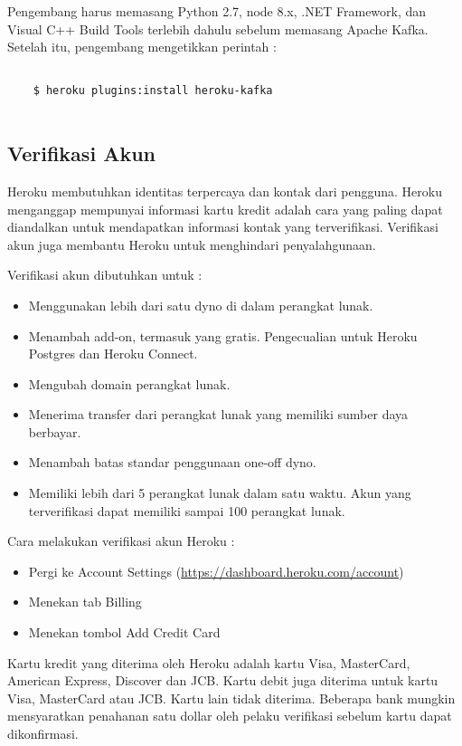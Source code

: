 Pengembang harus memasang Python 2.7, node 8.x, .NET Framework, dan Visual C++ Build Tools terlebih dahulu sebelum memasang Apache Kafka. Setelah itu, pengembang mengetikkan perintah :
\begin{lstlisting}
	
	$ heroku plugins:install heroku-kafka
	
\end{lstlisting}

\subsection{Verifikasi Akun}
Heroku membutuhkan identitas terpercaya dan kontak dari pengguna. Heroku menganggap mempunyai informasi kartu kredit adalah cara yang paling dapat diandalkan untuk mendapatkan informasi kontak yang terverifikasi. Verifikasi akun juga membantu Heroku untuk menghindari penyalahgunaan.

Verifikasi akun dibutuhkan untuk :
\begin{itemize}
\item Menggunakan lebih dari satu dyno di dalam perangkat lunak.
\item Menambah add-on, termasuk yang gratis. Pengecualian untuk Heroku Postgres dan Heroku Connect.
\item Mengubah domain perangkat lunak.
\item Menerima transfer dari perangkat lunak yang memiliki sumber daya berbayar.
\item Menambah batas standar penggunaan one-off dyno.
\item Memiliki lebih dari 5 perangkat lunak dalam satu waktu.  Akun yang terverifikasi dapat memiliki sampai 100 perangkat lunak.
\end{itemize}

Cara melakukan verifikasi akun Heroku :
\begin{itemize}
\item Pergi ke Account Settings (\url{https://dashboard.heroku.com/account})
\item Menekan tab Billing
\item Menekan tombol Add Credit Card
\end{itemize}

Kartu kredit yang diterima oleh Heroku adalah kartu Visa, MasterCard, American Express, Discover dan JCB. Kartu debit juga diterima untuk kartu Visa, MasterCard atau JCB. Kartu lain tidak diterima. Beberapa bank mungkin mensyaratkan penahanan satu dollar oleh pelaku verifikasi sebelum kartu dapat dikonfirmasi.

